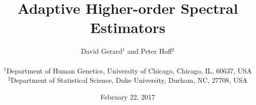 \documentclass[11pt,authoryear]{article}
\begin{document}
\singlespacing
\title{Adaptive Higher-order Spectral Estimators}
\author{David Gerard$^1$ and Peter Hoff$^{2}$ \\
\\
$^1$Department of Human Genetics,
University of Chicago, Chicago, IL, 60637, USA\\
$^2$Department of Statistical Science,
Duke University, Durham, NC, 27708, USA}
\date{February 22, 2017}
\maketitle
\let\thefootnote\relax{}









\appendix



\end{document}
